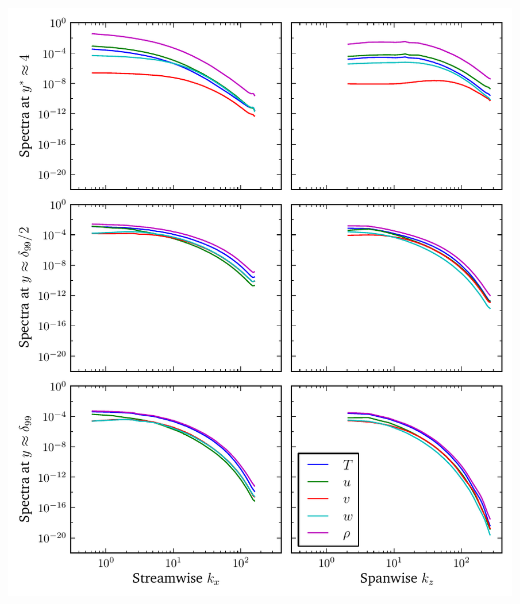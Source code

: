 \documentclass[mathserif]{beamer}
\begin{document}
\begin{frame}
\begin{columns}
\begin{column}{0.5\linewidth}
          \includegraphics[width=\textwidth]{spectra-turb4134}
        \end{column}
    \end{columns}
\end{frame}
\end{document}
